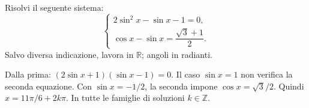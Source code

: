 
\begin{esercizio}
Risolvi il seguente sistema: 
\[
\begin{cases}
2\sin^2 x-\sin x-1=0,\\[2mm]
\cos x-\sin x=\dfrac{\sqrt{3}+1}{2}.
\end{cases}
\]
Salvo diversa indicazione, lavora in $\mathbb R$; angoli in radianti.
\end{esercizio}

\begin{soluzione}
Dalla prima: $(2\sin x+1)(\sin x-1)=0$.
Il caso $\sin x=1$ non verifica la seconda equazione.
Con $\sin x=-1/2$, la seconda impone $\cos x=\sqrt3/2$.
Quindi $x=11\pi/6+2k\pi$. In tutte le famiglie di soluzioni $k\in\mathbb{Z}$.
\end{soluzione}
